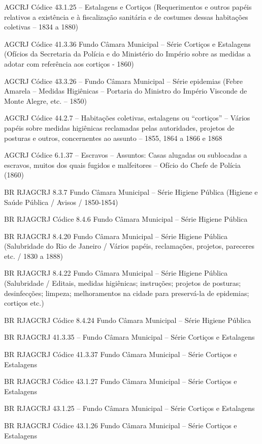 AGCRJ Códice 43.1.25 -- Estalagens e Cortiços (Requerimentos e outros
papéis relativos a existência e à fiscalização sanitária e de costumes
dessas habitações coletivas -- 1834 a 1880)

AGCRJ Códice 41.3.36 Fundo Câmara Municipal -- Série Cortiços e
Estalagens (Ofícios da Secretaria da Polícia e do Ministério do Império
sobre as medidas a adotar com referência aos cortiços - 1860)

AGCRJ Códice 43.3.26 -- Fundo Câmara Municipal -- Série epidemias (Febre
Amarela -- Medidas Higiênicas -- Portaria do Ministro do Império
Visconde de Monte Alegre, etc. -- 1850)

AGCRJ Códice 44.2.7 -- Habitações coletivas, estalagens ou ``cortiços''
-- Vários papéis sobre medidas higiênicas reclamadas pelas autoridades,
projetos de posturas e outros, concernentes ao assunto -- 1855, 1864 a
1866 e 1868

AGCRJ Códice 6.1.37 -- Escravos -- Assuntos: Casas alugadas ou
sublocadas a escravos, muitos dos quais fugidos e malfeitores -- Ofício
do Chefe de Polícia (1860)

BR RJAGCRJ 8.3.7 Fundo Câmara Municipal -- Série Higiene Pública
(Higiene e Saúde Pública / Avisos / 1850-1854)

BR RJAGCRJ Códice 8.4.6 Fundo Câmara Municipal -- Série Higiene Pública

BR RJAGCRJ 8.4.20 Fundo Câmara Municipal -- Série Higiene Pública
(Salubridade do Rio de Janeiro / Vários papéis, reclamações, projetos,
pareceres etc. / 1830 a 1888)

BR RJAGCRJ 8.4.22 Fundo Câmara Municipal -- Série Higiene Pública
(Salubridade / Editais, medidas higiênicas; instruções; projetos de
posturas; desinfecções; limpeza; melhoramentos na cidade para
preservá-la de epidemias; cortiços etc.)

BR RJAGCRJ Códice 8.4.24 Fundo Câmara Municipal -- Série Higiene Pública

BR RJAGCRJ 41.3.35 -- Fundo Câmara Municipal -- Série Cortiços e
Estalagens

BR RJAGCRJ Códice 41.3.37 Fundo Câmara Municipal -- Série Cortiços e
Estalagens

BR RJAGCRJ Códice 43.1.27 Fundo Câmara Municipal -- Série Cortiços e
Estalagens

BR RJAGCRJ 43.1.25 -- Fundo Câmara Municipal -- Série Cortiços e
Estalagens

BR RJAGCRJ Códice 43.1.26 Fundo Câmara Municipal -- Série Cortiços e
Estalagens

